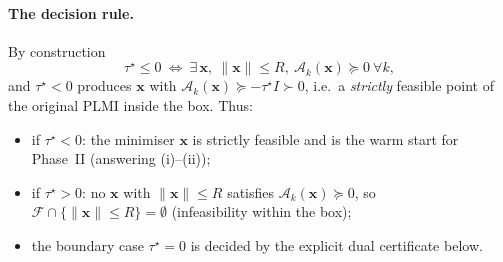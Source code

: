 \documentclass{amsart}
\begin{document}
\paragraph{The decision rule.}
By construction
\[
  \tau^\star\le0\ \Longleftrightarrow\ \exists\,\bm x,\ \|\bm x\|\le R,\ \mathcal A_k(\bm x)\succeq0\ \forall k,
\]
and $\tau^\star<0$ produces $\bm x$ with $\mathcal A_k(\bm x)\succeq-\tau^\star I\succ0$,
i.e.\ a \emph{strictly} feasible point of the original PLMI inside the box. Thus:
\begin{itemize}
\item if $\tau^\star<0$: the minimiser $\bm x$ is strictly feasible and is the warm
start for Phase~II (answering (i)--(ii));
\item if $\tau^\star>0$: no $\bm x$ with $\|\bm x\|\le R$ satisfies $\mathcal A_k(\bm
x)\succeq0$, so $\mathcal F\cap\{\|\bm x\|\le R\}=\emptyset$ (infeasibility within the
box);
\item the boundary case $\tau^\star=0$ is decided by the explicit dual certificate
below.
\end{itemize}
\end{document}
